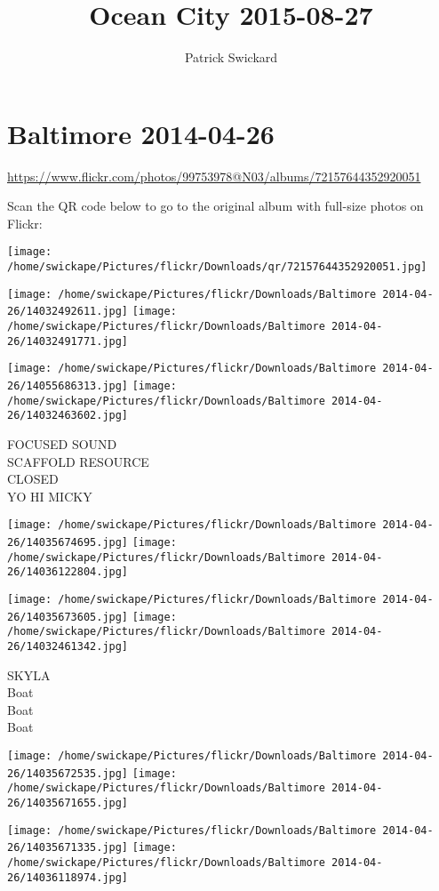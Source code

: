 \documentclass[10pt,letterpaper]{article}
\title{Ocean City 2015-08-27}
\author{Patrick Swickard}
\date{}
\begin{document}
\section*{Baltimore 2014-04-26}

\url{https://www.flickr.com/photos/99753978@N03/albums/72157644352920051}

Scan the QR code below to go to the original album with full-size photos on Flickr:

\texttt{[image: /home/swickape/Pictures/flickr/Downloads/qr/72157644352920051.jpg]}
\pagebreak

\texttt{[image: /home/swickape/Pictures/flickr/Downloads/Baltimore 2014-04-26/14032492611.jpg]}
\texttt{[image: /home/swickape/Pictures/flickr/Downloads/Baltimore 2014-04-26/14032491771.jpg]}

\texttt{[image: /home/swickape/Pictures/flickr/Downloads/Baltimore 2014-04-26/14055686313.jpg]}
\texttt{[image: /home/swickape/Pictures/flickr/Downloads/Baltimore 2014-04-26/14032463602.jpg]}

FOCUSED SOUND\\
SCAFFOLD RESOURCE\\
CLOSED\\
YO HI MICKY
\pagebreak

\texttt{[image: /home/swickape/Pictures/flickr/Downloads/Baltimore 2014-04-26/14035674695.jpg]}
\texttt{[image: /home/swickape/Pictures/flickr/Downloads/Baltimore 2014-04-26/14036122804.jpg]}

\texttt{[image: /home/swickape/Pictures/flickr/Downloads/Baltimore 2014-04-26/14035673605.jpg]}
\texttt{[image: /home/swickape/Pictures/flickr/Downloads/Baltimore 2014-04-26/14032461342.jpg]}

SKYLA\\
Boat\\
Boat\\
Boat
\pagebreak

\texttt{[image: /home/swickape/Pictures/flickr/Downloads/Baltimore 2014-04-26/14035672535.jpg]}
\texttt{[image: /home/swickape/Pictures/flickr/Downloads/Baltimore 2014-04-26/14035671655.jpg]}

\texttt{[image: /home/swickape/Pictures/flickr/Downloads/Baltimore 2014-04-26/14035671335.jpg]}
\texttt{[image: /home/swickape/Pictures/flickr/Downloads/Baltimore 2014-04-26/14036118974.jpg]}
\end{document}
